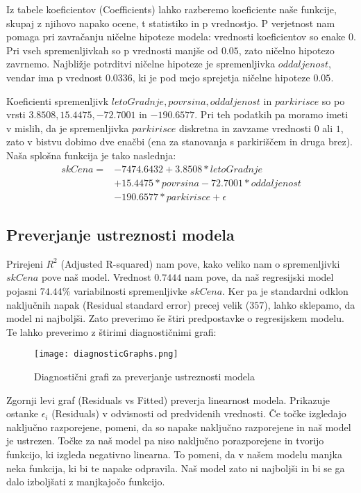 \documentclass[a4paper, 12pt]{article}
\begin{document}
Iz tabele koeficientov (Coefficients) lahko razberemo koeficiente naše
funkcije, skupaj z njihovo napako ocene, t statistiko in p vrednostjo. P
verjetnost nam pomaga pri zavračanju ničelne hipoteze modela: vrednosti
koeficientov so enake $ 0 $. Pri vseh spremenljivkah so p vrednosti manjše od
$ 0.05 $, zato ničelno hipotezo zavrnemo. Najbližje potrditvi ničelne hipoteze
je spremenljivka $ oddaljenost $, vendar ima p vrednost $ 0.0336 $, ki je pod
mejo sprejetja ničelne hipoteze $ 0.05 $.

Koeficienti spremenljivk $ letoGradnje, povrsina, oddaljenost $ in
$ parkirisce $ so po vrsti $ 3.8508, 15.4475, -72.7001 $ in $ -190.6577 $. Pri
teh podatkih pa moramo imeti v mislih, da je spremenljivka $ parkirisce $
diskretna in zavzame vrednosti $ 0 $ ali $ 1 $, zato v bistvu dobimo dve
enačbi (ena za stanovanja s parkiriščem in druga brez). Naša splošna funkcija
je tako naslednja:
\begin{equation}
\begin{split}
	skCena = &-7474.6432+3.8508*letoGradnje \\
			&+15.4475*povrsina-72.7001*oddaljenost \\
			&-190.6577*parkirisce+\epsilon
\end{split}
\end{equation}

\subsection{Preverjanje ustreznosti modela}

Prirejeni $ R^{2} $ (Adjusted R-squared) nam pove, kako veliko nam o
spremenljivki $ skCena $ pove naš model. Vrednost $ 0.7444 $ nam pove, da naš
regresijski model pojasni $ 74.44\% $ variabilnosti spremenljivke $ skCena $.
Ker pa je standardni odklon naključnih napak (Residual standard error) precej
velik ($ 357 $), lahko sklepamo, da model ni najboljši. Zato preverimo še štiri
predpostavke o regresijskem modelu. Te lahko preverimo z štirimi diagnostičnimi
grafi:
\begin{figure}[H]
	\centering
	\texttt{[image: diagnosticGraphs.png]}
	\caption{Diagnostični grafi za preverjanje ustreznosti modela}
	\label{figure:3}
\end{figure}

Zgornji levi graf (Residuals vs Fitted) preverja linearnost modela. Prikazuje
ostanke $ \epsilon_{i} $ (Residuals) v odvisnosti od predvidenih vrednosti. Če točke
izgledajo naključno razporejene, pomeni, da so napake naključno razporejene in
naš model je ustrezen. Točke za naš model pa niso naključno porazporejene in
tvorijo funkcijo, ki izgleda negativno linearna. To pomeni, da v našem modelu
manjka neka funkcija, ki bi te napake odpravila. Naš model zato ni najboljši in
bi se ga dalo izboljšati z manjkajočo funkcijo.
\end{document}
